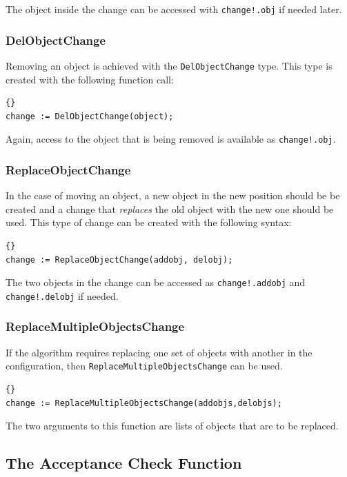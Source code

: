 \noindent The object inside the change can be accessed with
\texttt{change!.obj} if needed later.


\subsubsection{DelObjectChange}

Removing an object is achieved with the \texttt{DelObjectChange}
type.  This type is created with the following function call:

\begin{lstlisting}{}
change := DelObjectChange(object);
\end{lstlisting}

\noindent Again, access to the object that is being removed is
available as \texttt{change!.obj}.


\subsubsection{ReplaceObjectChange}

In the case of moving an object, a new object in the new position
should be be created and a change that \emph{replaces} the old object
with the new one should be used.  This type of change can be created
with the following syntax:

\begin{lstlisting}{}
change := ReplaceObjectChange(addobj, delobj);
\end{lstlisting}

\noindent The two objects in the change can be accessed as
\texttt{change!.addobj} and \texttt{change!.delobj} if needed.

\subsubsection{ReplaceMultipleObjectsChange}

If the algorithm requires replacing one set of objects with another in the
configuration, then \texttt{ReplaceMultipleObjectsChange} can be used.

\begin{lstlisting}{}
change := ReplaceMultipleObjectsChange(addobjs,delobjs);
\end{lstlisting}

\noindent The two arguments to this function are lists of objects that
are to be replaced.

\subsection{The Acceptance Check Function}

